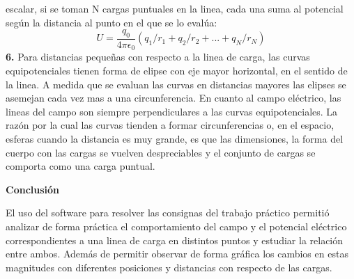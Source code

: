 \documentclass[11pt, letterpaper]{article}
\begin{document}
    escalar, si se toman N cargas puntuales en la linea, cada una suma
    al potencial según la distancia al punto en el que se lo evalúa:
    $$ U = \frac{q_0}{4\pi \epsilon_0}(q_1/r_1 + q_2/r_2 + ... + q_N/r_N) $$
    \textbf{6.} Para distancias pequeñas con respecto a la linea de carga, las curvas
    equipotenciales tienen forma de elipse con eje mayor horizontal, en el sentido
    de la linea. A medida que se evaluan las curvas en distancias mayores las
    elipses se asemejan cada vez mas a una circunferencia. En cuanto al campo
    eléctrico, las lineas del campo son siempre perpendiculares a las curvas
    equipotenciales. La razón por la cual las curvas tienden a formar circunferencias
    o, en el espacio, esferas cuando la distancia es muy grande, es que las 
    dimensiones, la forma del cuerpo con las cargas se vuelven despreciables 
    y el conjunto de cargas se comporta como una carga puntual.\\
\pagebreak
\begin{center}\textbf{Conclusión}\end{center}
    El uso del software para resolver las consignas del trabajo práctico
    permitió analizar de forma práctica el comportamiento del campo 
    y el potencial eléctrico correspondientes a una linea
    de carga en distintos puntos y estudiar la relación entre ambos.
    Además de permitir observar de forma gráfica los cambios en 
    estas magnitudes con diferentes posiciones y distancias con
    respecto de las cargas.
\end{document}
